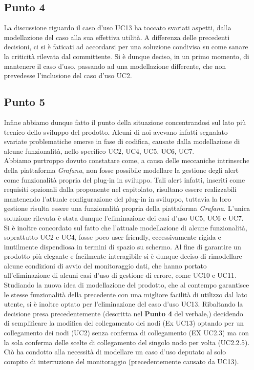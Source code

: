 \subsection{Punto 4}
La discussione riguardo il caso d'uso UC13 ha toccato svariati aspetti, dalla modellazione del caso alla sua effettiva utilità. A differenza delle precedenti decisioni, ci si è faticati ad accordarsi per una soluzione condivisa su come sanare la criticità rilevata dal committente. Si è dunque deciso, in un primo momento, di mantenere il caso d'uso, passando ad una modellazione differente, che non prevedesse l'inclusione del caso d'uso UC2.

\subsection{Punto 5}
Infine abbiamo dunque fatto il punto della situazione concentrandosi sul lato più tecnico dello sviluppo del prodotto. Alcuni di noi avevano infatti segnalato svariate problematiche emerse in fase di codifica, causate dalla modellazione di alcune funzionalità, nello specifico UC2, UC4, UC5, UC6, UC7.\\
Abbiamo purtroppo dovuto constatare come, a causa delle meccaniche intrinseche della piattaforma \textit{Grafana}, non fosse possibile modellare la gestione degli alert come funzionalità propria del plug-in in sviluppo. Tali alert infatti, inseriti come requisiti opzionali dalla proponente nel capitolato, risultano essere realizzabili mantenendo l'attuale configurazione del plug-in in sviluppo, tuttavia la loro gestione risulta essere una funzionalità propria della piattaforma \textit{Grafana}. L'unica soluzione rilevata è stata dunque l'eliminazione dei casi d'uso UC5, UC6 e UC7.\\
Si è inoltre concordato sul fatto che l'attuale modellazione di alcune funzionalità, soprattutto UC2 e UC4, fosse poco user friendly, eccessivamente rigida e inutilmente dispendiosa in termini di spazio su schermo. Al fine di garantire un prodotto più elegante e facilmente interagibile si è dunque deciso di rimodellare alcune condizioni di avvio del monitoraggio dati, che hanno portato all'eliminazione di alcuni casi d'uso di gestione di errore, come UC10 e UC11.\\
Studiando la nuova idea di modellazione del prodotto, che al contempo garantisce le stesse funzionalità della precedente con una migliore facilità di utilizzo dal lato utente, si è inoltre optato per l'eliminazione del caso d'uso UC13. Ribaltando la decisione presa precedentemente (descritta nel \textbf{Punto 4} del verbale,) decidendo di semplificare la modifica del collegamento dei nodi (Ex UC13) optando per un collegamento dei nodi (UC2) senza conferma di collegamento (EX UC2.3) ma con la sola conferma delle scelte di collegamento del singolo nodo per volta (UC2.2.5). Ciò ha condotto alla necessità di modellare un caso d'uso deputato al solo compito di interruzione del monitoraggio (precedentemente causato da UC13).\\
